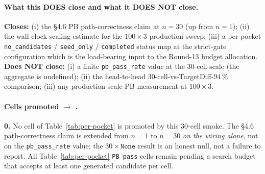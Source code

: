 \paragraph{What this DOES close and what it DOES NOT close.}
\textbf{Closes:} (i) the §4.6 PB path-correctness claim at
$n{=}30$ (up from $n{=}1$); (ii) the wall-clock scaling
estimate for the $100 \times 3$ production sweep; (iii) a
per-pocket \texttt{no\_candidates} / \texttt{seed\_only} /
\texttt{completed} status map at the strict-gate configuration
which is the load-bearing input to the Round-13 budget
allocation.  \textbf{Does NOT close:} (i) a finite
\texttt{pb\_pass\_rate} value at the $30$-cell scale (the
aggregate is undefined); (ii) the head-to-head
$30$-cell-vs-TargetDiff-$94\,\%$ comparison; (iii) any
production-scale PB measurement at $100 \times 3$.

\paragraph{Cells promoted \DESIGN{} $\to$ \MEASURED{}.}
\textbf{0.}  No cell of Table~\ref{tab:per-pocket} is
promoted by this 30-cell smoke.  The §4.6 path-correctness
claim is extended from $n{=}1$ to $n{=}30$ \emph{on the
wiring alone}, not on the \texttt{pb\_pass\_rate} value; the
$30 \times \texttt{None}$ result is an honest null, not a
failure to report.  All Table~\ref{tab:per-pocket}
\texttt{PB pass} cells remain \DESIGN{} pending a search
budget that accepts at least one generated candidate per cell.

